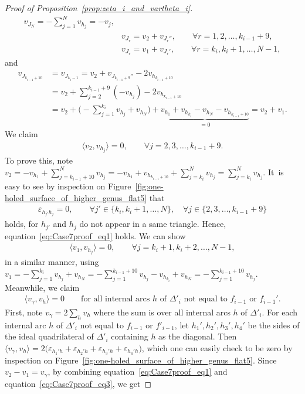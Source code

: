 \documentclass[pdftex]{sigma}
\numberwithin{equation}{section}
\theoremstyle{definition}
\begin{document}
\begin{proof}[Proof of Proposition~\ref{prop:zeta_i_and_vartheta_i}]
\begin{align*}
 v_{J_N} = -\sum_{j=1}^{N} v_{h_j} = -v_j, \\
&v_{J_r} = v_2 + v_{J_r''}, \qquad \forall r=1,2,\dots,k_{i-1}+9, \\
&v_{J_r} = v_1 + v_{J_r'}, \qquad \forall r = k_i,k_i+1,\dots,N-1,
\end{align*}
and
\begin{align*}
v_{J_{k_{i-1}+10}} & = v_{J_{k_i-1}} = v_2 + v_{J_{k_{i-1}+9}''} - 2 v_{h_{k_{i-1}+10}} \\
& = v_2 + \sum_{j=2}^{k_{i-1}+9} (-v_{h_j}) - 2 v_{h_{k_{i-1}+10}} \\
& = v_2 + \biggl( - \sum_{j=1}^{k_i} v_{h_j} + v_{h_N} \biggr) + \underbrace{ v_{h_1} + v_{h_{k_i}} - v_{h_N} - v_{h_{k_{i-1}+10}} }_{=0} = v_2 + v_1.
\end{align*}
We claim
\begin{align}
\label{eq:Case7proof_eq1}
\langle v_2, v_{h_j} \rangle=0, \qquad \forall j=2,3,\dots,k_{i-1}+9.
\end{align}
To prove this, note $v_2 = -v_{h_1} + \sum_{j=k_{i-1}+10}^N v_{h_j} = -v_{h_1} + v_{h_{k_{i-1}+10}} + \sum_{j=k_i}^N v_{h_j} = \sum_{j=k_i}^N v_{h_j}$. It~is easy to see by inspection on Figure~\ref{fig:one-holed_surface_of_higher_genus_flat5} that
\begin{align*}
\varepsilon_{h_{j'} h_j} = 0, \qquad \forall j' \in \{k_i,k_i+1,\dots,N\}, \quad \forall j \in \{2,3,\dots,k_{i-1}+9\}
\end{align*}
holds, for $h_{j'}$ and $h_j$ do not appear in a same triangle. Hence, equation~\eqref{eq:Case7proof_eq1} holds. We can show
\begin{align}
\label{eq:Case7proof_eq2}
\langle v_1, v_{h_j} \rangle=0, \qquad \forall j=k_i+1,k_i+2,\dots,N-1,
\end{align}
in a similar manner, using $v_1 = - \sum_{j=1}^{k_i} v_{h_j} + v_{h_N} = - \sum_{j=1}^{k_{i-1}+10} v_{h_j} - v_{h_{k_i}} + v_{h_N} = - \sum_{j=1}^{k_{i-1}+10} v_{h_j}$. Meanwhile, we claim
\begin{align}
\label{eq:Case7proof_eq3}
\langle v_\gamma, v_h \rangle=0 \qquad \mbox{for all internal arcs $h$ of $\Delta'_i$ not equal to $f_{i-1}$ or $f_{i-1}'$}.
\end{align}
First, note $v_\gamma = 2 \sum_h v_h$ where the sum is over all internal arcs $h$ of $\Delta'_i$. For each internal arc $h$ of $\Delta'_i$ not equal to $f_{i-1}$ or $f'_{i-1}$, let $h_1',h_2',h_3',h_4'$ be the sides of the ideal quadrilateral of $\Delta'_i$ containing $h$ as the diagonal. Then $\langle v_\gamma, v_h\rangle = 2\bigl(\varepsilon_{h_1' h} +\varepsilon_{h_2' h} +\varepsilon_{h_3' h} +\varepsilon_{h_4' h} \bigr)$, which one can easily check to be zero by inspection on Figure~\ref{fig:one-holed_surface_of_higher_genus_flat5}. Since $v_2 - v_1 = v_\gamma$, by combining equation~\eqref{eq:Case7proof_eq1} and equation~\eqref{eq:Case7proof_eq3}, we get

\end{proof}
\end{document}
